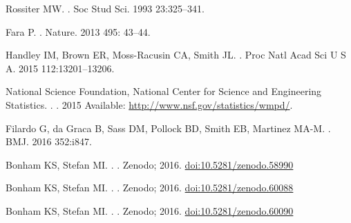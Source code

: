 \documentclass[10pt,letterpaper]{article}
\begin{document}
\begin{flushleft}
\begin{thebibliography}{10}
Rossiter MW.
.
\newblock  Soc Stud Sci. 1993 23:325–341.


Fara P.
.
\newblock Nature. 2013  495: 43–44.

Handley IM, Brown ER, Moss-Racusin CA, Smith JL.
.
\newblock  Proc Natl Acad Sci U S A.  2015 112:13201–13206.


National Science Foundation, National Center for Science and Engineering Statistics.
.
\newblock  [Internet]. 2015 Available: \url{http://www.nsf.gov/statistics/wmpd/}.

 Filardo G, da Graca B, Sass DM, Pollock BD, Smith EB, Martinez MA-M.
.
\newblock BMJ. 2016 352:i847.


Bonham KS, Stefan MI.
.
\newblock   [Internet]. Zenodo; 2016. \url{doi:10.5281/zenodo.58990}

Bonham KS, Stefan MI.
.
\newblock  [Internet]. Zenodo; 2016. \url{doi:10.5281/zenodo.60088}

 Bonham KS, Stefan MI.
.
\newblock  [Internet]. Zenodo; 2016. \url{doi:10.5281/zenodo.60090}





\end{thebibliography}


\end{flushleft}
\end{document}
